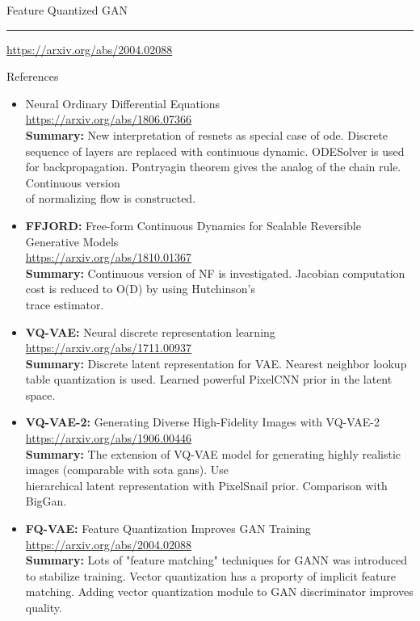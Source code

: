 \documentclass{beamer}
\begin{document}
\begin{frame}{Feature Quantized GAN}
	\hrule\medskip
	{\scriptsize \href{https://arxiv.org/abs/2004.02088}{https://arxiv.org/abs/2004.02088}} 
\end{frame}
\begin{frame}{References}
{\tiny
\begin{itemize}
    \item Neural Ordinary Differential Equations \\
    \href{https://arxiv.org/abs/1806.07366}{https://arxiv.org/abs/1806.07366} \\
    \textbf{Summary:} New interpretation of resnets as special case of ode. 
    Discrete sequence of layers  are replaced with continuous dynamic. ODESolver is used for backpropagation. Pontryagin theorem gives the analog of the chain rule. Continuous version \\ of normalizing flow is constructed.
    
    \item \textbf{FFJORD:} Free-form Continuous Dynamics for Scalable Reversible Generative Models \\
    \href{https://arxiv.org/abs/1810.01367}{https://arxiv.org/abs/1810.01367} \\
    \textbf{Summary:} Continuous version of NF is investigated. 
    Jacobian computation cost is reduced to O(D) by using Hutchinson’s \\ trace estimator. 
    
    \item \textbf{VQ-VAE:} Neural discrete representation learning \\
    \href{https://arxiv.org/abs/1711.00937}{https://arxiv.org/abs/1711.00937} \\
    \textbf{Summary:} Discrete latent representation for VAE. Nearest neighbor lookup table quantization is used. Learned powerful PixelCNN prior in the latent space.
    
    \item \textbf{VQ-VAE-2:} Generating Diverse High-Fidelity Images with VQ-VAE-2 \\
    \href{https://arxiv.org/abs/1906.00446}{https://arxiv.org/abs/1906.00446} \\
    \textbf{Summary:} The extension of VQ-VAE model for generating highly realistic images (comparable with sota gans). Use \\ hierarchical latent representation with PixelSnail prior. Comparison with BigGan.
    
    \item \textbf{FQ-VAE:} Feature Quantization Improves GAN Training \\
    \href{https://arxiv.org/abs/2004.02088}{https://arxiv.org/abs/2004.02088} \\
    \textbf{Summary:} Lots of "feature matching" techniques for GANN was introduced to stabilize training. Vector quantization has a proporty of implicit feature matching. Adding vector quantization module to GAN discriminator improves quality.
\end{itemize}
}
\end{frame}
\end{document}
